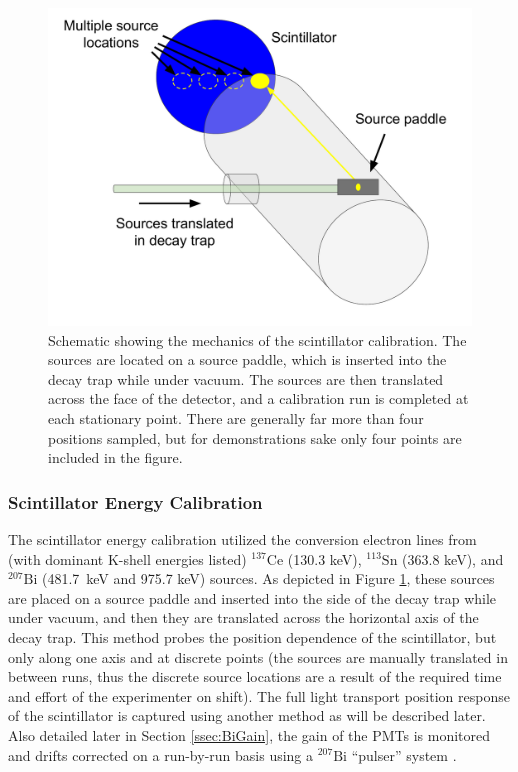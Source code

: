 \begin{figure}[h]
  \centering
  \includegraphics[scale=0.5]{2-UCNAExperiment/calProcess.pdf}
  \caption{Schematic showing the mechanics of the scintillator calibration. The sources
    are located on a source paddle, which is inserted into the decay trap while under
    vacuum. The sources are then translated across the face of the detector, and a
    calibration run is completed at each stationary point. There are generally far more
    than four positions sampled, but for demonstrations sake only four points are
    included in the figure.}
  \label{fig:sourceTranslate}
\end{figure}

\subsubsection{Scintillator Energy Calibration} \label{sssec:scintEnCal}

The scintillator energy calibration utilized the conversion electron lines from
(with dominant K-shell energies listed) $^{137}\mathrm{Ce}$
(130.3 keV), $^{113}\mathrm{Sn}$ (363.8 keV), and $^{207}\mathrm{Bi}$ (481.7~keV and 975.7 keV)
sources. As depicted in Figure \ref{fig:sourceTranslate},
these sources are placed on a source paddle and inserted into the side of the
decay trap while under vacuum, and then they are translated across the horizontal axis of the decay
trap. This method probes the position dependence of the scintillator, but only along one axis and
at discrete points (the sources are manually translated in between runs, thus the discrete source locations
are a result of the required time and effort of the experimenter on shift).
The full light transport position response of the scintillator is captured using another method as will be
described later. Also detailed later in Section \ref{ssec:BiGain}, the gain of the PMTs is monitored
and drifts corrected 
on a run-by-run basis using a $^{207}\mathrm{Bi}$ ``pulser'' system \cite{morris1976stable}.

